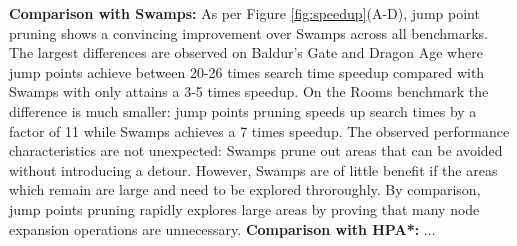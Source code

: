 \textbf{Comparison with Swamps: }
As per Figure \ref{fig:speedup}(A-D), jump point pruning shows a convincing
improvement over Swamps across all benchmarks. 
The largest differences are observed on Baldur's Gate and Dragon Age where jump 
points achieve between 20-26 times search time speedup compared with Swamps with 
only attains a 3-5 times speedup.
On the Rooms benchmark the difference is much smaller: jump points pruning
speeds up search times by a factor of 11 while Swamps achieves a 7 times
speedup.
The observed performance characteristics are not unexpected: Swamps prune out
areas that can be avoided without introducing a detour. However, Swamps are of
little benefit if the areas which remain are large and need to be explored 
throroughly.
By comparison, jump points pruning rapidly explores large areas by proving
that many node expansion operations are unnecessary.
\textbf{Comparison with HPA*: }
$\ldots$
